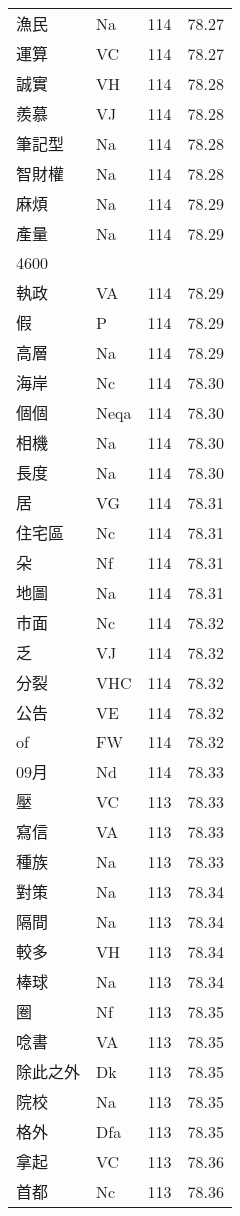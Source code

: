 \documentclass[twocolumn]{book}
\begin{document}
\begin{supertabular}{llrr}
漁民 & Na & 114 &  78.27\\
運算 & VC & 114 &  78.27\\
誠實 & VH & 114 &  78.28\\
羨慕 & VJ & 114 &  78.28\\
筆記型 & Na & 114 &  78.28\\
智財權 & Na & 114 &  78.28\\
麻煩 & Na & 114 &  78.29\\
產量 & Na & 114 &  78.29\\
4600\\
執政 & VA & 114 &  78.29\\
假 & P & 114 &  78.29\\
高層 & Na & 114 &  78.29\\
海岸 & Nc & 114 &  78.30\\
個個 & Neqa & 114 &  78.30\\
相機 & Na & 114 &  78.30\\
長度 & Na & 114 &  78.30\\
居 & VG & 114 &  78.31\\
住宅區 & Nc & 114 &  78.31\\
朵 & Nf & 114 &  78.31\\
地圖 & Na & 114 &  78.31\\
市面 & Nc & 114 &  78.32\\
乏 & VJ & 114 &  78.32\\
分裂 & VHC & 114 &  78.32\\
公告 & VE & 114 &  78.32\\
of & FW & 114 &  78.32\\
09月 & Nd & 114 &  78.33\\
壓 & VC & 113 &  78.33\\
寫信 & VA & 113 &  78.33\\
種族 & Na & 113 &  78.33\\
對策 & Na & 113 &  78.34\\
隔間 & Na & 113 &  78.34\\
較多 & VH & 113 &  78.34\\
棒球 & Na & 113 &  78.34\\
圈 & Nf & 113 &  78.35\\
唸書 & VA & 113 &  78.35\\
除此之外 & Dk & 113 &  78.35\\
院校 & Na & 113 &  78.35\\
格外 & Dfa & 113 &  78.35\\
拿起 & VC & 113 &  78.36\\
首都 & Nc & 113 &  78.36\\

\end{supertabular}
\end{document}
